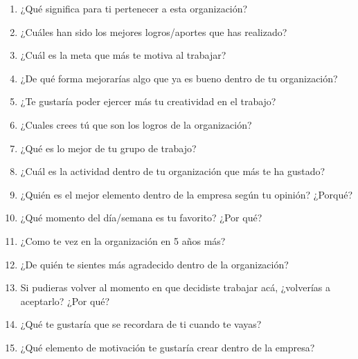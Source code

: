 \begin{enumerate}
    \item  ¿Qué significa para ti pertenecer a esta organización? 
    \item  ¿Cuáles han sido los mejores logros/aportes que has realizado?
    \item  ¿Cuál es la meta que más te motiva al trabajar?
    \item  ¿De qué forma mejorarías algo que ya es bueno dentro de tu organización?
    \item  ¿Te gustaría poder ejercer más tu creatividad en el trabajo?
    \item  ¿Cuales crees tú que son los logros de la organización?
    \item  ¿Qué es lo mejor de tu grupo de trabajo?
    \item  ¿Cuál es la actividad dentro de tu organización que más te ha gustado?
    \item  ¿Quién es el mejor elemento dentro de la empresa según tu opinión? ¿Porqué?
    \item  ¿Qué momento del día/semana es tu favorito? ¿Por qué?
    \item  ¿Como te vez en la organización en 5 años más?
    \item  ¿De quién te sientes más agradecido dentro de la organización?
    \item  Si pudieras volver al momento en que decidiste trabajar acá, ¿volverías a aceptarlo? ¿Por qué?
    \item  ¿Qué te gustaría que se recordara de ti cuando te vayas?
    \item  ¿Qué elemento de motivación te gustaría crear dentro de la empresa?
\end{enumerate}
